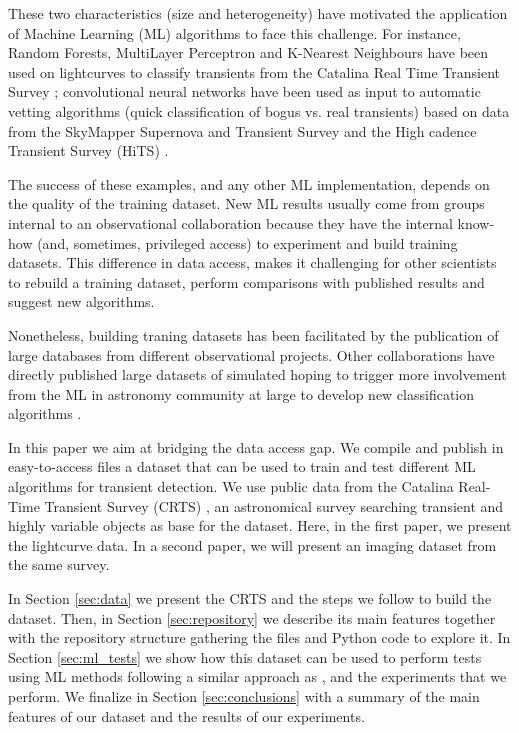 \documentclass[usenatbib]{mnras}
\begin{document}
These two characteristics (size and heterogeneity) have
motivated the application of Machine Learning (ML) algorithms to face
this challenge.  
For instance, Random Forests, MultiLayer Perceptron and K-Nearest
Neighbours have been used on lightcurves to classify transients from
the Catalina Real Time Transient Survey \citep{1601.03931};  
convolutional neural networks have been used as 
input to automatic vetting algorithms (quick classification of bogus
vs. real transients) based on data from the SkyMapper Supernova and
Transient  Survey and the High cadence Transient Survey (HiTS)
\citep{1708.08947,1701.00458}.

The success of these examples, and any other ML implementation,
depends on the quality of the training dataset.
New ML results usually come from groups internal to an observational
collaboration because they have the internal know-how (and, sometimes,
privileged access) to experiment and build training datasets.
This difference in data access, makes it challenging for other
scientists to rebuild a training dataset, perform comparisons with
published results and suggest new algorithms. 

Nonetheless, building traning datasets has been facilitated by the
publication of large databases from different observational projects.
Other collaborations have directly published large datasets of simulated
hoping to trigger more involvement from the ML in astronomy
community at large to develop new classification algorithms \citep{2018arXiv181000001T}.

In this paper we aim at bridging the data access gap.
We compile and publish in easy-to-access files a dataset
that can be used to train and test different ML algorithms for
transient detection. 
We use public data from the Catalina Real-Time Transient Survey
(CRTS) \citep{1111.2566}, an astronomical survey searching transient
and highly variable objects as base for the dataset.
Here, in the first paper, we present the lightcurve data.
In a second paper, we will present an imaging dataset from the same
survey.   

\newpage
In Section \ref{sec:data} we present the CRTS and the steps we follow
to build the dataset.
Then, in Section \ref{sec:repository} we describe its main features together
with the repository structure gathering the files and Python code to explore it. 
In Section \ref{sec:ml_tests} we show how this dataset can be used to 
perform tests using ML methods following a similar approach as \cite{1601.03931},
and the experiments that we perform. 
We finalize in Section \ref{sec:conclusions} with a summary of the
main features of our dataset and the results of our experiments. 
\end{document}

